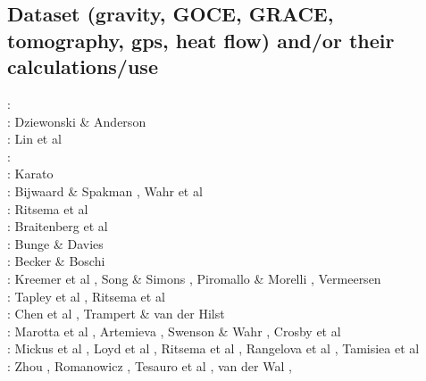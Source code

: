 \subsection{Dataset (gravity, GOCE, GRACE, tomography, gps, heat flow) 
and/or their calculations/use}

\begin{scriptsize}
\nineteenseventyseven: \cite{rola77}\\
\nineteeneightyone: Dziewonski \& Anderson \cite{dzan81}\\
\nineteenninety: Lin et al \cite{lips90}\\
\nineteenninetyone: \cite{spak91}\\
\nineteenninetythree: Karato \cite{kara93}\\
\nineteenninetyeight: Bijwaard \& Spakman \cite{bisp98}, Wahr et al \cite{wamb98}\\
\nineteenninetynine: Ritsema et al \cite{rivw99}\\
\twothousand: Braitenberg et al \cite{brzf00}\\
\twothousandone: Bunge \& Davies \cite{buda01}\\
\twothousandtwo: Becker \& Boschi \cite{bebo02}\\
\twothousandthree: Kreemer et al \cite{krhh03}, Song \& Simons \cite{sosi03}, 
Piromallo \& Morelli \cite{pimo03}, Vermeersen \cite{verm03}\\
\twothousandfour: Tapley et al \cite{tabr04}, Ritsema et al \cite{rivw04}\\
\twothousandfive: Chen et al \cite{chrw05}, Trampert \& van der Hilst \cite{trva05}\\
\twothousandsix: Marotta et al \cite{masr06}, Artemieva \cite{arte06}, Swenson \& Wahr \cite{swwa06}, Crosby et al \cite{crms06}\\
\twothousandseven: Mickus et al \cite{mitk07}, Loyd et al \cite{lobc07}, Ritsema et al \cite{rimb07}, 
Rangelova et al \cite{ravb07}, Tamisiea et al \cite{tamd07}\\
\twothousandeight: Zhou \cite{zhou08}, Romanowicz \cite{roma08}, Tesauro et al \cite{tekc08}, van der Wal \cite{vaws08}, 

\end{scriptsize}

